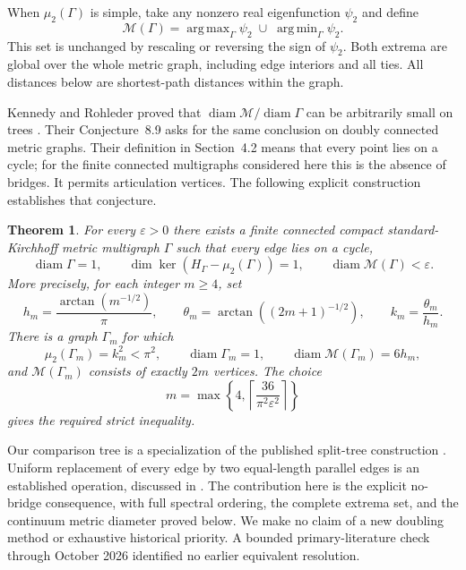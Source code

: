 \documentclass[11pt]{article}
\numberwithin{equation}{section}
\newtheorem{theorem}{Theorem}
\theoremstyle{remark}
\newcommand{\diam}{\operatorname{diam}}
\newcommand{\M}{\mathcal M}
\DeclareMathOperator{\argmax}{arg\,max}
\DeclareMathOperator{\argmin}{arg\,min}
\begin{document}
When \(\mu_2(\Gamma)\) is simple, take any nonzero real eigenfunction
\(\psi_2\) and define
\begin{equation}\label{eq:extrema}
  \M(\Gamma)=\argmax_\Gamma\psi_2\;\cup\;\argmin_\Gamma\psi_2.
\end{equation}
This set is unchanged by rescaling or reversing the sign of \(\psi_2\).
Both extrema are global over the whole metric graph, including edge
interiors and all ties. All distances below are shortest-path distances
within the graph.

Kennedy and Rohleder proved that \(\diam\M/\diam\Gamma\) can be
arbitrarily small on trees
\cite[Proposition~4.11 and Example~6.2]{KennedyRohleder2021}.
Their Conjecture~8.9 asks for the same conclusion on doubly connected
metric graphs. Their definition in Section~4.2 means that every point
lies on a cycle; for the finite connected multigraphs considered here
this is the absence of bridges. It permits articulation vertices.
The following explicit construction establishes that conjecture.

\begin{theorem}\label{thm:main}
For every \(\varepsilon>0\) there exists a finite connected compact
standard-Kirchhoff metric multigraph \(\Gamma\) such that every edge
lies on a cycle,
\[
  \diam\Gamma=1,\qquad
  \dim\ker(H_\Gamma-\mu_2(\Gamma))=1,\qquad
  \diam\M(\Gamma)<\varepsilon.
\]
More precisely, for each integer \(m\geq4\), set
\begin{equation}\label{eq:parameters}
  h_m=\frac{\arctan(m^{-1/2})}{\pi},\qquad
  \theta_m=\arctan((2m+1)^{-1/2}),\qquad
  k_m=\frac{\theta_m}{h_m}.
\end{equation}
There is a graph \(\Gamma_m\) for which
\begin{equation}\label{eq:main-formulas}
  \mu_2(\Gamma_m)=k_m^2<\pi^2,\qquad
  \diam\Gamma_m=1,\qquad
  \diam\M(\Gamma_m)=6h_m,
\end{equation}
and \(\M(\Gamma_m)\) consists of exactly \(2m\) vertices.
The choice
\begin{equation}\label{eq:epsilon-choice}
  m=\max\left\{4,\left\lceil\frac{36}{\pi^2\varepsilon^2}\right\rceil\right\}
\end{equation}
gives the required strict inequality.
\end{theorem}

Our comparison tree is a specialization of the published split-tree
construction \cite[Example~6.2]{KennedyRohleder2021}. Uniform replacement
of every edge by two equal-length parallel edges is an established
operation, discussed in \cite[Section~4.3]{Kennedy2024}.
The contribution here is the explicit no-bridge consequence, with full
spectral ordering, the complete extrema set, and the continuum metric
diameter proved below. We make no claim of a new doubling method or
exhaustive historical priority. A bounded primary-literature check
through October 2026 identified no earlier equivalent resolution.
\end{document}
